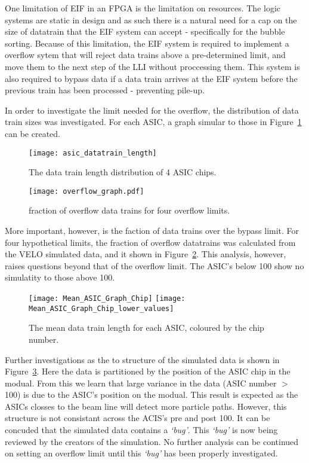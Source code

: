		One limitation of EIF in an FPGA is the limitation on resources. 
		The logic systems are static in design and as such there is a natural need for a cap on the size of datatrain that the EIF system can accept - specifically for the bubble sorting.
		Because of this limitation, the EIF system is required to implement a overflow sytem that will reject data trains above a pre-determined limit, and move them to the next step of the LLI without proccessing them.
		This system is also required to bypass data if a data train arrives at the EIF system before the previous train has been processed - preventing pile-up.
		\par
		In order to investigate the limit needed for the overflow, the distribution of data train sizes was investigated. For each ASIC, a graph simular to those in Figure~\ref{fig:asic_datatrain} can be created.

		\begin{figure}[h]
			\centering
			\texttt{[image: asic\_datatrain\_length]}
			\caption{The data train length distribution of 4 ASIC chips.}
			\label{fig:asic_datatrain}
		\end{figure}
		\par
		\begin{figure}[h]
			\centering
			\texttt{[image: overflow\_graph.pdf]}
			\caption{fraction of overflow data trains for four overflow limits.}
			\label{fig:overflow_franction}
		\end{figure}\FloatBarrier
		More important, however, is the faction of data trains over the bypass limit.
		For four hypothetical limits, the fraction of overflow datatrains was calculated from the VELO simulated data, and it shown in Figure~\ref{fig:overflow_franction}.
		This analysis, however, raises questions beyond that of the overflow limit.
		The ASIC's below 100 show no simulatity to those above 100.

		\begin{figure}[h]
			\centering
			\texttt{[image: Mean\_ASIC\_Graph\_Chip]}
			\texttt{[image: Mean\_ASIC\_Graph\_Chip\_lower\_values]}
			\caption{The mean data train length for each ASIC, coloured by the chip number.}
			\label{fig:asic_structure}
		\end{figure}\FloatBarrier
		Further investigations as the to structure of the simulated data is shown in Figure~\ref{fig:asic_structure}.
		Here the data is partitioned by the position of the ASIC chip in the modual.
		From this we learn that large variance in the data (ASIC number $>$ 100) is due to the ASIC's position on the modual.
		This result is expected as the ASICs closses to the beam line will detect more particle paths.
		However, this structure is not consistant across the ACIS's pre and post 100.
		It can be concuded that the simulated data contains a \textit{`bug'}.
		This \textit{`bug'} is now being reviewed by the creators of the simulation. 
		No further analysis can be continued on setting an overflow limit until this \textit{`bug'} has been properly investigated.

